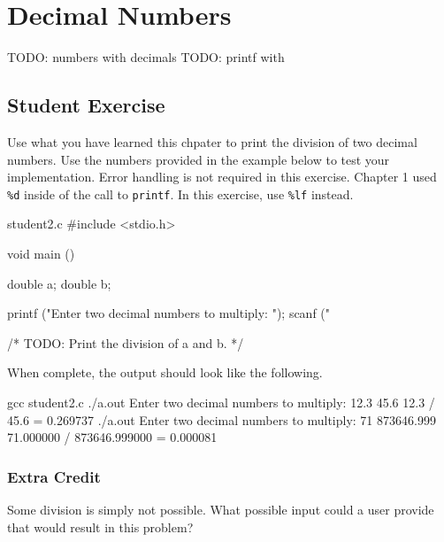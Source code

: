 \chapter{Decimal Numbers}

TODO: numbers with decimals
TODO: printf with %

\section{Student Exercise}

Use what you have learned this chpater to print the division of two decimal
numbers. Use the numbers provided in the example below to test your
implementation. Error handling is not required in this exercise. Chapter 1 used
\verb|%d| inside of the call to \verb|printf|. In this exercise, use \verb|%lf|
instead.

\begin{code}{student2.c}
#include <stdio.h>

void main ()
{
    double a;
    double b;

    printf ("Enter two decimal numbers to multiply: ");
    scanf ("%

    /* TODO: Print the division of a and b. */
}
\end{code}

When complete, the output should look like the following.

\begin{Terminal}
gcc student2.c
./a.out
Enter two decimal numbers to multiply: 12.3 45.6
12.3 / 45.6 = 0.269737
./a.out
Enter two decimal numbers to multiply: 71 873646.999
71.000000 / 873646.999000 = 0.000081
\end{Terminal}

\subsection{Extra Credit}

Some division is simply not possible. What possible input could a user provide
that would result in this problem?
